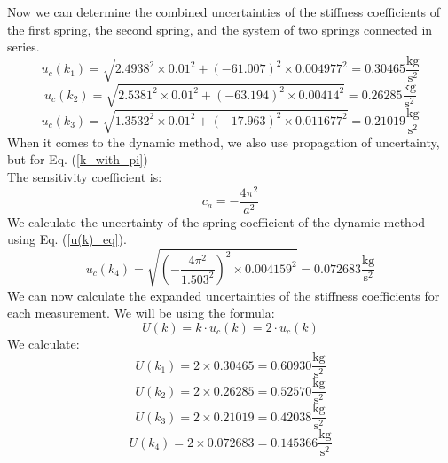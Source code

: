 \documentclass[a4paper,12pt,titlepage,bibliography=numbered]{article}
\begin{document}
Now we can determine the combined uncertainties of the stiffness coefficients of the first spring, the second spring, and the system of two springs connected in series. \\
\begin{equation}
    u_c(k_1) = \sqrt{2.4938^2 \times 0.01^2 + (-61.007)^2 \times 0.004977^2} = 0.30465 \mathrm{\frac{kg}{s^2}}
\end{equation}
\begin{equation}
    u_c(k_2) = \sqrt{2.5381^2 \times 0.01^2 + (-63.194)^2 \times 0.00414^2} = 0.26285 \mathrm{\frac{kg}{s^2}}
\end{equation}
\begin{equation}
    u_c(k_3) = \sqrt{1.3532^2 \times 0.01^2 + (-17.963)^2 \times 0.011677^2} = 0.21019 \mathrm{\frac{kg}{s^2}}
\end{equation}
When it comes to the dynamic method, we also use propagation of uncertainty, but for Eq. (\ref{k_with_pi}) \\
The sensitivity coefficient is:
\begin{equation}
    c_a = -\frac{4 \pi ^2 }{a^2}
\end{equation}
We calculate the uncertainty of the spring coefficient of the dynamic method using Eq. (\ref{u(k)_eq}).
\begin{equation}
    u_c(k_4) = \sqrt{(-\frac{4 \pi ^2}{1.503^2})^2 \times 0.004159^2} = 0.072683 \mathrm{\frac{kg}{s^2}}
\end{equation}
We can now calculate the expanded uncertainties of the stiffness coefficients for each measurement. We will be using the formula:
\begin{equation}
    U(k) = k \cdot u_c(k) = 2 \cdot u_c(k)
\end{equation}
We calculate:
\begin{equation}
    U(k_1) = 2 \times 0.30465 = 0.60930 \mathrm{\frac{kg}{s^2}}
\end{equation}
\begin{equation}
    U(k_2) = 2 \times 0.26285 = 0.52570 \mathrm{\frac{kg}{s^2}}
\end{equation}
\begin{equation}
    U(k_3) = 2 \times 0.21019 = 0.42038 \mathrm{\frac{kg}{s^2}}
\end{equation}
\begin{equation}
    U(k_4) = 2 \times 0.072683 = 0.145366 \mathrm{\frac{kg}{s^2}}
\end{equation}
\end{document}
